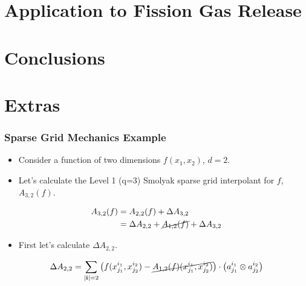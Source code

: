 \documentclass{beamer}
\begin{document}
\section{Application to Fission Gas Release}



\section{Conclusions}



\section*{Extras}

\begin{frame}
\frametitle{Sparse Grid Mechanics Example}

\begin{itemize}
  \item Consider a function of two dimensions $f(x_1, x_2)$, $d=2$. 
  \item Let's calculate the Level 1 (q=3) Smolyak sparse grid interpolant for $f$, $A_{3,2}(f)$.
\end{itemize}

\begin{align*}
A_{3,2}(f) &= A_{2,2}(f) + \Delta A_{3,2} \\
&= \Delta A_{2,2} + \cancel{A_{1,2}(f)} + \Delta A_{3,2} 
\end{align*}

\begin{itemize}
  \item First let's calculate $\Delta A_{2,2}$. 
\end{itemize}

\begin{align*}
    \Delta A_{2,2} = \sum_{\vert\textbf{i}\vert=2}
     \left(f(x_{j_1}^{i_1},x_{j_2}^{i_2}) - 
      \cancel{A_{1,2}(f)(x_{j_1}^{i_1}, x_{j_2}^{i_2})}\right)\cdot
       \left(a_{j_1}^{i_1}\otimes a_{j_2}^{i_2}\right)
\end{align*}

\end{frame}
\end{document}
